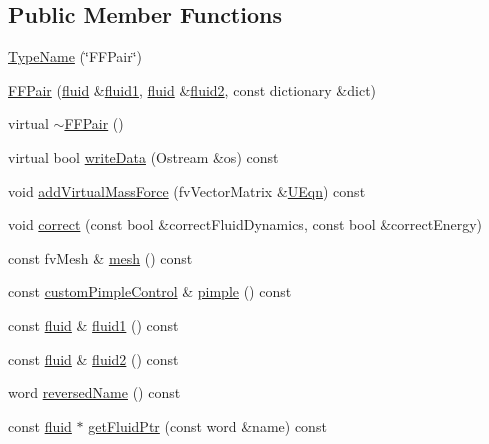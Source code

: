 \subsection*{Public Member Functions}
\begin{DoxyCompactItemize}
\item 
\hyperlink{classFoam_1_1FFPair_a8c03a5e29d701d9556d8868e31b22f9a}{Type\+Name} (\char`\"{}F\+F\+Pair\char`\"{})
\item 
\hyperlink{classFoam_1_1FFPair_a96e5e09fe81bdd4bf544bb08e02fc4cb}{F\+F\+Pair} (\hyperlink{classFoam_1_1fluid}{fluid} \&\hyperlink{classFoam_1_1FFPair_a6676ebc5398ae4c515c27a6405cea62b}{fluid1}, \hyperlink{classFoam_1_1fluid}{fluid} \&\hyperlink{classFoam_1_1FFPair_aab793f84ac558a425b7bb6c8ca16176b}{fluid2}, const dictionary \&dict)
\item 
virtual \hyperlink{classFoam_1_1FFPair_ad44924f767442ceb103b5818d41610da}{$\sim$\+F\+F\+Pair} ()
\item 
virtual bool \hyperlink{classFoam_1_1FFPair_a73ace448c639d2e1c943852abe89af7c}{write\+Data} (Ostream \&os) const
\item 
void \hyperlink{classFoam_1_1FFPair_ab3bae8a59a44782c488f44e6ad1b34d1}{add\+Virtual\+Mass\+Force} (fv\+Vector\+Matrix \&\hyperlink{UEqn__1pl_8H_afd1b8693a3c3032de396035e7045d467}{U\+Eqn}) const
\item 
void \hyperlink{classFoam_1_1FFPair_ac892bd86a9a69984720308f911ec306f}{correct} (const bool \&correct\+Fluid\+Dynamics, const bool \&correct\+Energy)
\item 
const fv\+Mesh \& \hyperlink{classFoam_1_1FFPair_a470f06cfb9b6ee887cd85d63de275607}{mesh} () const
\item 
const \hyperlink{classFoam_1_1customPimpleControl}{custom\+Pimple\+Control} \& \hyperlink{classFoam_1_1FFPair_a34a78e242f55cbd5157f017f58951205}{pimple} () const
\item 
const \hyperlink{classFoam_1_1fluid}{fluid} \& \hyperlink{classFoam_1_1FFPair_a6676ebc5398ae4c515c27a6405cea62b}{fluid1} () const
\item 
const \hyperlink{classFoam_1_1fluid}{fluid} \& \hyperlink{classFoam_1_1FFPair_aab793f84ac558a425b7bb6c8ca16176b}{fluid2} () const
\item 
word \hyperlink{classFoam_1_1FFPair_af027c18dbb04da1eb58783b66faa7f5b}{reversed\+Name} () const
\item 
const \hyperlink{classFoam_1_1fluid}{fluid} $\ast$ \hyperlink{classFoam_1_1FFPair_a51af2e97564ecb788a3c58c34c21f356}{get\+Fluid\+Ptr} (const word \&name) const

\end{DoxyCompactItemize}
